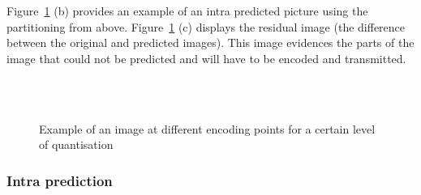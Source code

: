 \documentclass[11pt,a4paper,openright,twoside]{book}
\numberwithin{equation}{section} %
\numberwithin{figure}{section} %
\numberwithin{table}{section} %
\begin{document}
Figure~\ref{fig:part_orig_pred_res_image} (b) provides an example of an intra
predicted picture using the partitioning from above.
Figure~\ref{fig:part_orig_pred_res_image} (c) displays the residual image (the
difference between the original and predicted images).
This image evidences the parts of the image that could not be predicted and
will have to be encoded and transmitted.

\begin{figure}[tb]
	\centering
	\\
	\\
	\caption{Example of an image at different encoding points for a
	certain level of quantisation}
	\label{fig:part_orig_pred_res_image}
\end{figure}

\subsubsection{Intra prediction}
\label{ssub:intra_prediction}
\end{document}

